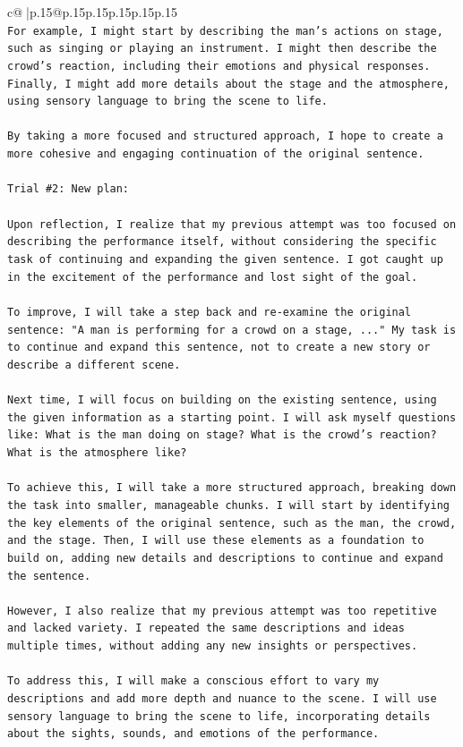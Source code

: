 \documentclass{article}
\begin{document}
{\begin{supertabular}{c@{$\;$}|p{.15\linewidth}@{}p{.15\linewidth}p{.15\linewidth}p{.15\linewidth}p{.15\linewidth}p{.15\linewidth}}
{{{\\ 
\texttt{For example, I might start by describing the man's actions on stage, such as singing or playing an instrument. I might then describe the crowd's reaction, including their emotions and physical responses. Finally, I might add more details about the stage and the atmosphere, using sensory language to bring the scene to life.} \\
\\ 
\texttt{By taking a more focused and structured approach, I hope to create a more cohesive and engaging continuation of the original sentence.} \\
\\ 
\texttt{Trial \#2: New plan: } \\
\\ 
\texttt{Upon reflection, I realize that my previous attempt was too focused on describing the performance itself, without considering the specific task of continuing and expanding the given sentence. I got caught up in the excitement of the performance and lost sight of the goal.} \\
\\ 
\texttt{To improve, I will take a step back and re{-}examine the original sentence: "A man is performing for a crowd on a stage, ..." My task is to continue and expand this sentence, not to create a new story or describe a different scene.} \\
\\ 
\texttt{Next time, I will focus on building on the existing sentence, using the given information as a starting point. I will ask myself questions like: What is the man doing on stage? What is the crowd's reaction? What is the atmosphere like?} \\
\\ 
\texttt{To achieve this, I will take a more structured approach, breaking down the task into smaller, manageable chunks. I will start by identifying the key elements of the original sentence, such as the man, the crowd, and the stage. Then, I will use these elements as a foundation to build on, adding new details and descriptions to continue and expand the sentence.} \\
\\ 
\texttt{However, I also realize that my previous attempt was too repetitive and lacked variety. I repeated the same descriptions and ideas multiple times, without adding any new insights or perspectives.} \\
\\ 
\texttt{To address this, I will make a conscious effort to vary my descriptions and add more depth and nuance to the scene. I will use sensory language to bring the scene to life, incorporating details about the sights, sounds, and emotions of the performance.} \\
}}}
\end{supertabular}}
\end{document}
